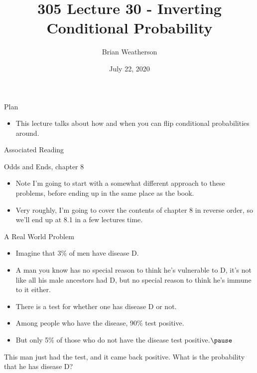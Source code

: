 \documentclass[
  ignorenonframetext,
]{beamer}
\title{305 Lecture 30 - Inverting Conditional Probability}
\author{Brian Weatherson}
\date{July 22, 2020}
\providecommand{\tightlist}{%
  \setlength{\itemsep}{0pt}\setlength{\parskip}{0pt}}
\renewcommand{\,}{\text{, }}
\begin{document}
\frame{\titlepage}

\begin{frame}{Plan}
\protect\hypertarget{plan}{}

\begin{itemize}
\tightlist
\item
  This lecture talks about how and when you can flip conditional
  probabilities around.
\end{itemize}

\end{frame}

\begin{frame}{Associated Reading}
\protect\hypertarget{associated-reading}{}

Odds and Ends, chapter 8

\begin{itemize}
\tightlist
\item
  Note I'm going to start with a somewhat different approach to these
  problems, before ending up in the same place as the book.
\item
  Very roughly, I'm going to cover the contents of chapter 8 in reverse
  order, so we'll end up at 8.1 in a few lectures time.
\end{itemize}

\end{frame}

\begin{frame}{A Real World Problem}
\protect\hypertarget{a-real-world-problem}{}

\begin{itemize}
\tightlist
\item
  Imagine that 3\% of men have disease D.
\item
  A man you know has no special reason to think he's vulnerable to D,
  it's not like all his male ancestors had D, but no special reason to
  think he's immune to it either.
\item
  There is a test for whether one has disease D or not.
\item
  Among people who have the disease, 90\% test positive.
\item
  But only 5\% of those who do not have the disease test
  positive.\(\pause\)
\end{itemize}

This man just had the test, and it came back positive. What is the
probability that he has disease D?

\end{frame}
\end{document}
